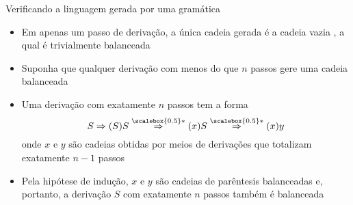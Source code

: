 \begin{frame}[fragile]{Verificando a linguagem gerada por uma gramática}

    \begin{itemize}
        \item Em apenas um passo de derivação, a única cadeia gerada é a cadeia vazia , a qual é trivialmente balanceada
        \pause

        \item Suponha que qualquer derivação com menos do que $n$ passos gere uma cadeia balanceada
        \pause

        \item Uma derivação com exatamente $n$ passos tem a forma
        \[
            S\Rightarrow (S)S \overset{\scalebox{0.5}*}{\Rightarrow} (x)S \overset{\scalebox{0.5}*}{\Rightarrow} (x)y
        \]
        onde $x$ e $y$ são cadeias obtidas por meios de derivações que totalizam exatamente $n - 1$ passos
        \pause

        \item Pela hipótese de indução, $x$ e $y$ são cadeias de parêntesis balanceadas e, portanto, a derivação $S$ com exatamente $n$ passos também é balanceada
    \end{itemize}

\end{frame}

